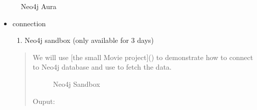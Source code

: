 \documentclass[letterpaper,11pt,english]{sphinxmanual}
\begin{document}
\begin{figure}[htbp]
\centering
\capstart

\noindent{}
\caption{Neo4j Aura}\label{\detokenize{rag:id68}}\label{\detokenize{rag:fig-neo4j}}\end{figure}
\begin{itemize}
\item {} 
\sphinxAtStartPar
connection
\begin{enumerate}
%
\item {} 
\sphinxAtStartPar
Neo4j sandbox (only available for 3 days)

\end{enumerate}
\begin{quote}

\sphinxAtStartPar
We will use {[}the small Movie project{]}() to demonstrate
how to connect to Neo4j database and use  to fetch the data.

\begin{figure}[htbp]
\centering
\capstart

\noindent{}
\caption{Neo4j Sandbox}\label{\detokenize{rag:id69}}\label{\detokenize{rag:fig-neo4j-sb}}\end{figure}

\begin{sphinxVerbatim}[commandchars=\\\{\}]
  
 
  
    

\end{sphinxVerbatim}

\sphinxAtStartPar
Ouput:


\end{quote}
\end{itemize}
\end{document}
